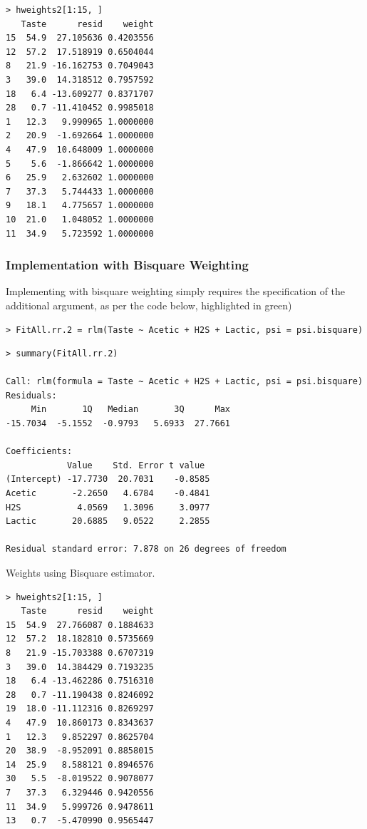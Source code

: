 \documentclass[12pt, a4paper]{article}
\theoremstyle{plain}
\theoremstyle{definition}
\theoremstyle{remark}
\begin{document}
\begin{verbatim}
> hweights2[1:15, ]
   Taste      resid    weight
15  54.9  27.105636 0.4203556
12  57.2  17.518919 0.6504044
8   21.9 -16.162753 0.7049043
3   39.0  14.318512 0.7957592
18   6.4 -13.609277 0.8371707
28   0.7 -11.410452 0.9985018
1   12.3   9.990965 1.0000000
2   20.9  -1.692664 1.0000000
4   47.9  10.648009 1.0000000
5    5.6  -1.866642 1.0000000
6   25.9   2.632602 1.0000000
7   37.3   5.744433 1.0000000
9   18.1   4.775657 1.0000000
10  21.0   1.048052 1.0000000
11  34.9   5.723592 1.0000000
\end{verbatim}
\subsubsection{Implementation with Bisquare Weighting}
Implementing with bisquare weighting simply requires the specification of the additional argument, as per the code below, highlighted in green)
\begin{framed}
\begin{verbatim}
> FitAll.rr.2 = rlm(Taste ~ Acetic + H2S + Lactic, psi = psi.bisquare)
\end{verbatim}
\end{framed}
\begin{verbatim}
> summary(FitAll.rr.2)

Call: rlm(formula = Taste ~ Acetic + H2S + Lactic, psi = psi.bisquare)
Residuals:
     Min       1Q   Median       3Q      Max 
-15.7034  -5.1552  -0.9793   5.6933  27.7661 

Coefficients:
            Value    Std. Error t value 
(Intercept) -17.7730  20.7031    -0.8585
Acetic       -2.2650   4.6784    -0.4841
H2S           4.0569   1.3096     3.0977
Lactic       20.6885   9.0522     2.2855

Residual standard error: 7.878 on 26 degrees of freedom
\end{verbatim}



Weights using Bisquare estimator.

\begin{verbatim}
> hweights2[1:15, ]
   Taste      resid    weight
15  54.9  27.766087 0.1884633
12  57.2  18.182810 0.5735669
8   21.9 -15.703388 0.6707319
3   39.0  14.384429 0.7193235
18   6.4 -13.462286 0.7516310
28   0.7 -11.190438 0.8246092
19  18.0 -11.112316 0.8269297
4   47.9  10.860173 0.8343637
1   12.3   9.852297 0.8625704
20  38.9  -8.952091 0.8858015
14  25.9   8.588121 0.8946576
30   5.5  -8.019522 0.9078077
7   37.3   6.329446 0.9420556
11  34.9   5.999726 0.9478611
13   0.7  -5.470990 0.9565447
\end{verbatim}
\end{document}
